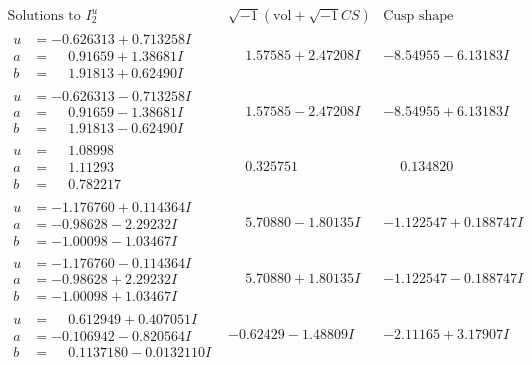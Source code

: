 \documentclass[1p]{elsarticle_modified}
\theoremstyle{definition}
\newcommand{\I}{\sqrt{-1}}
\begin{document}
$$\begin{array}{c|c|c}  
\text{Solutions to }I^u_{2}& \I (\text{vol} + \sqrt{-1}CS) & \text{Cusp shape}\\
 \hline 
\begin{aligned}
u &= -0.626313 + 0.713258 I \\
a &= \phantom{-}0.91659 + 1.38681 I \\
b &= \phantom{-}1.91813 + 0.62490 I\end{aligned}
 & \phantom{-}1.57585 + 2.47208 I & -8.54955 - 6.13183 I \\ \hline\begin{aligned}
u &= -0.626313 - 0.713258 I \\
a &= \phantom{-}0.91659 - 1.38681 I \\
b &= \phantom{-}1.91813 - 0.62490 I\end{aligned}
 & \phantom{-}1.57585 - 2.47208 I & -8.54955 + 6.13183 I \\ \hline\begin{aligned}
u &= \phantom{-}1.08998\phantom{ +0.000000I} \\
a &= \phantom{-}1.11293\phantom{ +0.000000I} \\
b &= \phantom{-}0.782217\phantom{ +0.000000I}\end{aligned}
 & \phantom{-}0.325751\phantom{ +0.000000I} & \phantom{-}0.134820\phantom{ +0.000000I} \\ \hline\begin{aligned}
u &= -1.176760 + 0.114364 I \\
a &= -0.98628 - 2.29232 I \\
b &= -1.00098 - 1.03467 I\end{aligned}
 & \phantom{-}5.70880 - 1.80135 I & -1.122547 + 0.188747 I \\ \hline\begin{aligned}
u &= -1.176760 - 0.114364 I \\
a &= -0.98628 + 2.29232 I \\
b &= -1.00098 + 1.03467 I\end{aligned}
 & \phantom{-}5.70880 + 1.80135 I & -1.122547 - 0.188747 I \\ \hline\begin{aligned}
u &= \phantom{-}0.612949 + 0.407051 I \\
a &= -0.106942 - 0.820564 I \\
b &= \phantom{-}0.1137180 - 0.0132110 I\end{aligned}
 & -0.62429 - 1.48809 I & -2.11165 + 3.17907 I \\ \hline\begin{aligned}

\end{aligned}
\end{array}$$
\end{document}
